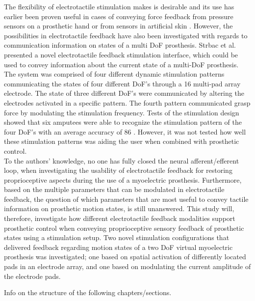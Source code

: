 The flexibility of electrotactile stimulation makes is desirable and its use has earlier been proven useful in cases of conveying force feedback from pressure sensors on a prosthetic hand or from sensors in artificial skin \cite{Hartmann2014,Franceschi2015}. However, the possibilities in electrotactile feedback have also been investigated with regards to communication information on states of a multi DoF prosthesis. Strbac et al. \cite{Strbac2016} presented a novel electrotactile feedback stimulation interface, which could be used to convey information about the current state of a multi-DoF prosthesis. The system was comprised of four different dynamic stimulation patterns communicating the states of four different DoF's through a 16 multi-pad array electrode. The state of three different DoF's were communicated by altering the electrodes activated in a specific pattern. The fourth pattern communicated grasp force by modulating the stimulation frequency. Tests of the stimulation design showed that six amputees were able to recognize the stimulation pattern of the four DoF's with an average accuracy of 86 \percent. \cite{Strbac2016} However, it was not tested how well these stimulation patterns was aiding the user when combined with prosthetic control.  \\   
%
To the authors' knowledge, no one has fully closed the neural afferent/efferent loop, when investigating the usability of electrotactile feedback for restoring proprioceptive aspects during the use of a myoelectric prosthesis. Furthermore, based on the multiple parameters that can be modulated in electrotactile feedback, the question of which parameters that are most useful to convey tactile information on prosthetic motion states, is still unanswered. This study will, therefore, investigate how different electrotactile feedback modalities support prosthetic control when conveying proprioceptive sensory feedback of prosthetic states using a stimulation setup. Two novel stimulation configurations that delivered feedback regarding motion states of a two DoF virtual myoelectric prosthesis was investigated; one based on spatial activation of differently located pads in an electrode array, and one based on modulating the current amplitude of the electrode pads.

Info on the structure of the following chapters/sections.
















